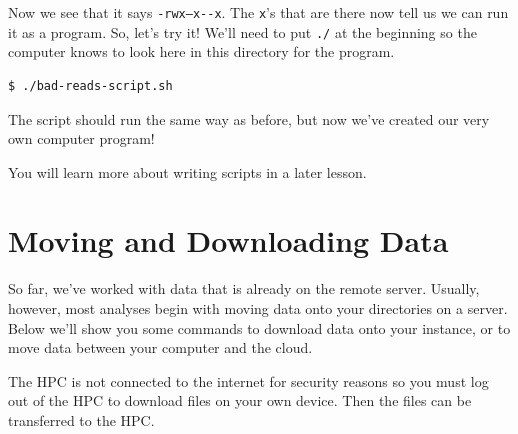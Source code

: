 \documentclass[
  letterpaper,
  DIV=11,
  numbers=noendperiod]{scrreprt}
\newenvironment{Shaded}{\begin{snugshade}}{\end{snugshade}}
\newcommand{\ExtensionTok}[1]{\textcolor[rgb]{0.00,0.23,0.31}{#1}}
\newcommand{\NormalTok}[1]{\textcolor[rgb]{0.00,0.23,0.31}{#1}}
\begin{document}
Now we see that it says \texttt{-rwx–x-\/-x}. The \texttt{x}'s that are
there now tell us we can run it as a program. So, let's try it! We'll
need to put \texttt{./} at the beginning so the computer knows to look
here in this directory for the program.

\begin{verbatim}
$ ./bad-reads-script.sh
\end{verbatim}

The script should run the same way as before, but now we've created our
very own computer program!

You will learn more about writing scripts in a later lesson.

\section{\texorpdfstring{\textbf{Moving and Downloading
Data}}{Moving and Downloading Data}}\label{moving-and-downloading-data}

So far, we've worked with data that is already on the remote server.
Usually, however, most analyses begin with moving data onto your
directories on a server. Below we'll show you some commands to download
data onto your instance, or to move data between your computer and the
cloud.

\begin{tcolorbox}[enhanced jigsaw, opacitybacktitle=0.6, colback=white, coltitle=black, opacityback=0, rightrule=.15mm, toptitle=1mm, toprule=.15mm, bottomtitle=1mm, colframe=quarto-callout-warning-color-frame, arc=.35mm, titlerule=0mm, colbacktitle=quarto-callout-warning-color!10!white, leftrule=.75mm, title=\textcolor{quarto-callout-warning-color}{\faExclamationTriangle}\hspace{0.5em}{No internet on HPC}, breakable, bottomrule=.15mm, left=2mm]

The HPC is not connected to the internet for security reasons so you
must log out of the HPC to download files on your own device. Then the
files can be transferred to the HPC.

\begin{Shaded}
\end{Shaded}

\end{tcolorbox}
\end{document}

